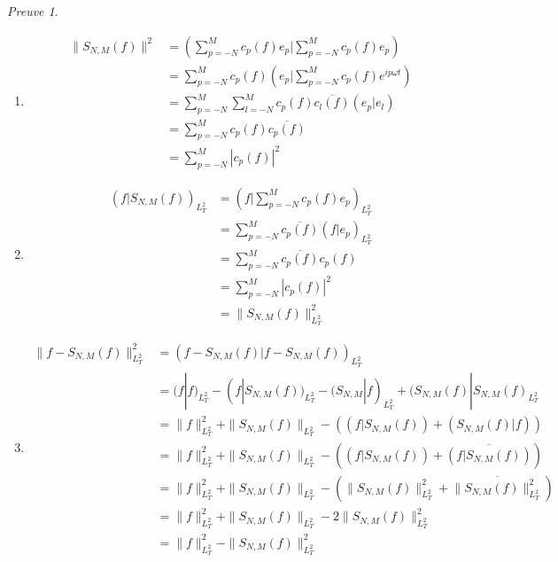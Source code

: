 \documentclass[]{article}
\theoremstyle{remark}
\newtheorem{myproof}{Preuve}
\theoremstyle{definition}
\begin{document}
\begin{myproof}
	\begin{enumerate}
		\item $$\begin{aligned}
			\|S_{N, M}(f)\|^2 &= \left(\sum_{p=-N}^{M} c_p(f)e_p |\sum_{p=-N}^{M} c_p(f)e_p\right) \\
			&=\sum_{p=-N}^{M} c_p(f) \left(e_p |\sum_{p=-N}^{M} c_p(f)e^{i p \omega t}\right)\\
			&=\sum_{p=-N}^{M} \sum_{l=-N}^{M} c_p(f) \overline{c_l(f)} \left(e_p |e_l\right) \\
			&= \sum_{p=-N}^{M} c_p(f) \overline{c_p(f)} \\
			&=\sum_{p=-N}^{M} |c_p(f)|^2
		\end{aligned}
		$$
		
		\item $$\begin{aligned}
			\left(f | S_{N, M}(f)\right)_{L_T^2} &= \left(f | \sum_{p=-N}^{M} c_p(f) e_p\right)_{L_T^2}\\
			&=\sum_{p=-N}^{M} \overline{c_p(f)} \left(f |e_p\right)_{L_T^2} \\
			&=\sum_{p=-N}^{M} \overline{c_p(f)} c_p(f) \\
			&= \sum_{p=-N}^{M} |c_p(f)|^2 \\
			&= \|S_{N, M}(f)\|_{L_T^2}^2
		\end{aligned}$$
		
		\item $$\begin{aligned}{}
				\|f-S_{N, M}(f)\|^2_{L_T^2}&=(f - S_{N, M}(f) | f - S_{N, M}(f))_{L_T^2} \\
				&= (f | f)_{L_T^2} - (f | S_{N, M}(f))_{L_T^2} - (S_{N, M} | f)_{L_T^2} + (S_{N, M}(f) | S_{N, M}(f)_{L_T^2}\\
				&=\|f\|^2_{L_T^2} + \|S_{N, M}(f)\|_{L_T^2} - ((f | S_{N, M}(f)) + (S_{N, M}(f) | f)) \\
				&=\|f\|^2_{L_T^2} + \|S_{N, M}(f)\|_{L_T^2} - ((f | S_{N, M}(f)) + \overline{(f | S_{N, M}(f))}) \\
				&=\|f\|^2_{L_T^2} + \|S_{N, M}(f)\|_{L_T^2} - (\|S_{N, M}(f)\|^2_{L_T^2} + \overline{\|S_{N, M}(f)\|^2_{L_T^2}})\\
				&=\|f\|^2_{L_T^2} + \|S_{N, M}(f)\|_{L_T^2} - 2 \|S_{N, M}(f)\|^2_{L_T^2}\\
				&=\|f\|^2_{L_T^2} - \|S_{N, M}(f)\|^2_{L_T^2}	\end{aligned}$$
	\end{enumerate}
\end{myproof}
\end{document}
